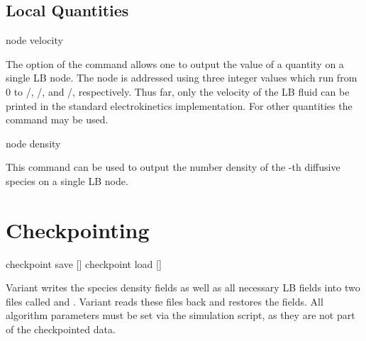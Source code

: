 \subsection{\label{ssec:ek-local-quantities}Local Quantities}

\begin{essyntax}
  node    
  velocity
  \begin{features}
  \end{features}
\end{essyntax}
The  option of the  command allows one to output 
the value of a quantity on a single LB node. The node is addressed using three
integer values which run from 0 to /,
/, and /, respectively. Thus far,
only the velocity of the LB fluid can be printed in the standard electrokinetics
implementation. For other quantities the  command may be used. 

\begin{essyntax}
  node   
  density
  \begin{features}
  \end{features}
\end{essyntax}
This command can be used to output the number density of the
-th diffusive species on a single LB node.

\section{\label{ssec:ek-checkpointing}Checkpointing}

\begin{essyntax}
   checkpoint save []
   checkpoint load []
  \begin{features}
  \end{features}
\end{essyntax}
Variant  writes the species density fields as well as all necessary 
LB fields into two files called  and .
Variant  reads these files back and restores the fields. All 
algorithm parameters must be set via the simulation script, as they are not 
part of the checkpointed data.

